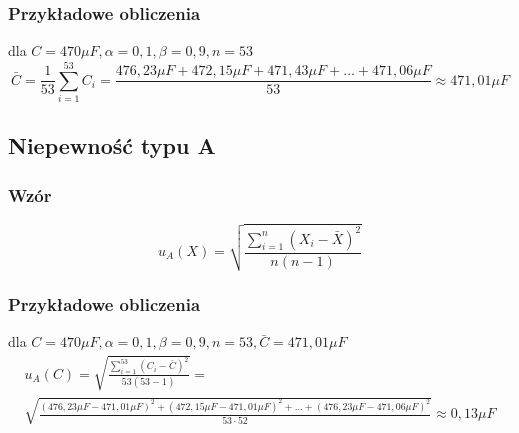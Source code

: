 \documentclass[12pt]{mwart}
\begin{document}
	\subsubsection{Przykładowe obliczenia}
	dla $C=470\mu F, \alpha=0,1, \beta=0,9, n=53$
	\begin{equation}
		\bar C = \frac{1}{53}\sum\limits_{i=1}^{53} C_{i}=\frac{476,23\mu F+472,15\mu F+471,43\mu F+\dots +471,06\mu F}{53}\approx471,01\mu F
	\end{equation}
	\subsection{Niepewność typu A}
	\subsubsection{Wzór}
	\begin{equation}
		u_{A}\left(X\right)=\sqrt{\frac{\sum\limits_{i=1}^{n}{\left(X_{i}-\bar X\right)}^2}{n\left(n-1\right)}}
	\end{equation}
	\subsubsection{Przykładowe obliczenia}
	dla $C=470\mu F, \alpha=0,1, \beta=0,9, n=53, \bar C=471,01\mu F$
	\begin{multline}
		u_{A}\left(C\right)=\sqrt{\frac{\sum\limits_{i=1}^{53}{\left(C_{i}-\bar C\right)}^2}{53\left(53-1\right)}}=\\ \sqrt{\frac{{\left(476,23\mu F-471,01\mu F\right)}^2+{\left(472,15\mu F-471,01\mu F\right)}^2+\dots +{\left(476,23\mu F-471,06\mu F\right)}^2}{53\cdot 52}}\approx0,13\mu F
	\end{multline}
\end{document}
